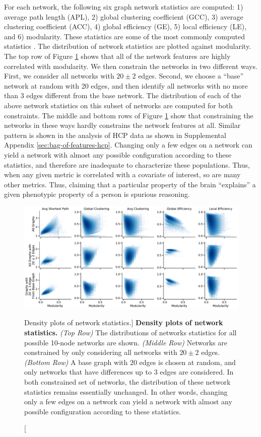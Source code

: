 For each network, the following six graph network statistics are computed: 1) average path length (APL), 2) global clustering coefficient (GCC), 3) average clustering coefficient (ACC), 4) global efficiency (GE), 5) local efficiency (LE), and 6) modularity. These statistics are some of the most commonly computed statistics \cite{sporns2005human,Bullmore2009-yj}. The distribution of network statistics are plotted against modularity. 
The top row of Figure \ref{fig:exp6} shows that all of the network features are highly correlated with modularity.
We then constrain the networks in two different ways. First, we consider all networks with $20 \pm 2$ edges. Second, we choose a ``base'' network at random with 20 edges, and then identify all networks with no more than 3 edges different from the  base network. The distribution of each of the above network statistics on this subset of networks are computed for both constraints. The middle and bottom rows of Figure \ref{fig:exp6} show that constraining the networks in these ways hardly constrains the network features at all. Similar pattern is shown in the analysis of HCP data as shown in Supplemental Appendix \ref{sec:bag-of-features-hcp}. Changing only a few edges on a network can yield a network with almost any possible configuration according to these statistics, and therefore are inadequate to characterize these populations. Thus, when any given metric is correlated with a covariate of interest, so are many other metrics. Thus, claiming that a particular property of the brain ``explains'' a given phenotypic property of a person is spurious reasoning.

\begin{figure} 
    \centering
    \includegraphics[width=\textwidth]{figures/dnd/density_num_edge_20_row}
    \caption
    [Density plots of network statistics.]
    {\textbf{Density plots of network statistics.} \textit{(Top Row)} The distributions of networks statistics for all possible 10-node networks are shown. \textit{(Middle Row)} Networks are constrained by only considering all networks with $20 \pm 2$ edges. \textit{(Bottom Row)} A base graph with $20$ edges is chosen at random, and only networks that have differences up to $3$ edges are considered. In both constrained set of networks, the distribution of these network statistics remains essentially unchanged. In other words, changing only a few edges on a network can yield a network with almost any possible configuration according to these statistics. }
    \label{fig:exp6}
\end{figure}

